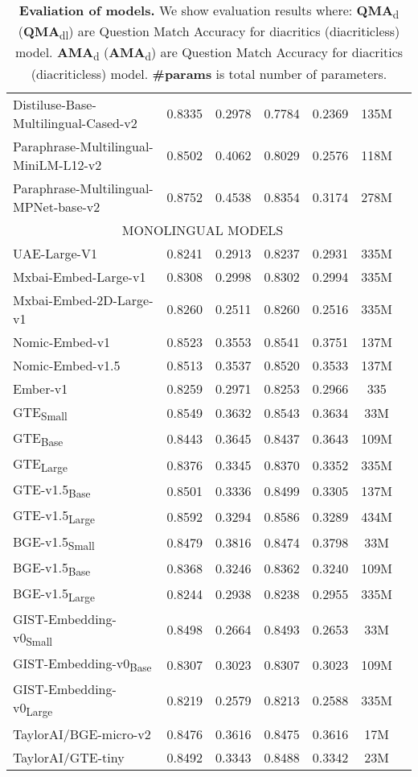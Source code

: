 \begin{table*}[ht!]
\begin{tabular}{lcccccc}
      Distiluse-Base-Multilingual-Cased-v2 & 0.8335 & 0.2978 & 0.7784 & 0.2369 & 135M \\
      Paraphrase-Multilingual-MiniLM-L12-v2 & 0.8502 & 0.4062 & 0.8029 & 0.2576 & 118M \\
      Paraphrase-Multilingual-MPNet-base-v2 & 0.8752 & 0.4538 & 0.8354 & 0.3174 & 278M \\
      \hline
      \multicolumn{6}{c}{MONOLINGUAL MODELS} \\
      \hline
      UAE-Large-V1 & 0.8241 & 0.2913 & 0.8237 & 0.2931 & 335M \\
      Mxbai-Embed-Large-v1 & 0.8308 & 0.2998 & 0.8302 & 0.2994 & 335M \\
      Mxbai-Embed-2D-Large-v1 & 0.8260 & 0.2511 & 0.8260 & 0.2516 & 335M \\
      Nomic-Embed-v1 & 0.8523 & 0.3553 & 0.8541 & 0.3751 & 137M \\
      Nomic-Embed-v1.5 & 0.8513 & 0.3537 & 0.8520 & 0.3533 & 137M \\
      Ember-v1 & 0.8259 & 0.2971 & 0.8253 & 0.2966 & 335 \\
      GTE\textsubscript{Small} & 0.8549 & 0.3632 & 0.8543 & 0.3634 & 33M \\
      GTE\textsubscript{Base} & 0.8443 & 0.3645 & 0.8437 & 0.3643 & 109M \\
      GTE\textsubscript{Large} & 0.8376 & 0.3345 & 0.8370 & 0.3352 & 335M \\
      GTE-v1.5\textsubscript{Base} & 0.8501 & 0.3336 & 0.8499 & 0.3305 & 137M \\
      GTE-v1.5\textsubscript{Large} & 0.8592 & 0.3294 & 0.8586 & 0.3289 & 434M \\
      BGE-v1.5\textsubscript{Small} & 0.8479 & 0.3816 & 0.8474 & 0.3798 & 33M \\
      BGE-v1.5\textsubscript{Base} & 0.8368 & 0.3246 & 0.8362 & 0.3240 & 109M \\
      BGE-v1.5\textsubscript{Large} & 0.8244 & 0.2938 & 0.8238 & 0.2955 & 335M \\
      GIST-Embedding-v0\textsubscript{Small} & 0.8498 & 0.2664 & 0.8493 & 0.2653 & 33M \\
      GIST-Embedding-v0\textsubscript{Base} & 0.8307 & 0.3023 & 0.8307 & 0.3023 & 109M \\
      GIST-Embedding-v0\textsubscript{Large} & 0.8219 & 0.2579 & 0.8213 & 0.2588 & 335M \\
      TaylorAI/BGE-micro-v2 & 0.8476 & 0.3616 & 0.8475 & 0.3616 & 17M \\
      TaylorAI/GTE-tiny & 0.8492 & 0.3343 & 0.8488 & 0.3342 & 23M \\
      \bottomrule
    \end{tabular}
    \caption{\textbf{Evaliation of models.}
    We show evaluation results where:
    \textbf{QMA}\textsubscript{d} (\textbf{QMA}\textsubscript{dl}) are Question Match Accuracy for diacritics (diacriticless) model.
    \textbf{AMA}\textsubscript{d} (\textbf{AMA}\textsubscript{d}) are Question Match Accuracy for diacritics (diacriticless) model.
    \textbf{\#params} is total number of parameters.}
    \label{tab:evaluatinon}
  \end{table*}
  